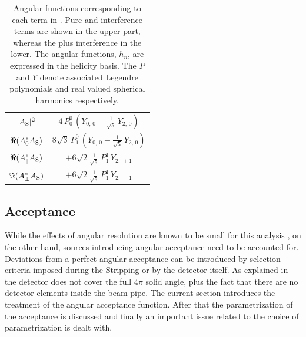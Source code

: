\begin{table}[t]
\begin{tabular}{cc}
    \hline
    $|{A}_{{\text{S}}}|^2$  &
      $4\, P_0^0\, (Y_{0,\,0} - \tfrac{1}{\sqrt{5}}\, Y_{2,\,0})$  \\ %

    $\Re({A}_{0}^* {A}_{{\text{S}}})$  &
      $8\sqrt{3}\, P_1^0\, (Y_{0,\,0} - \tfrac{1}{\sqrt{5}}\, Y_{2,\,0})$ \\ %

    $\Re({A}_{\parallel}^* {A}_{{\text{S}}})$  &
      $+6\sqrt{2}\tfrac{1}{\sqrt{5}}\, P_1^1\, Y_{2,\,+1}$  \\ %

    $\Im({A}_{\perp}^* {A}_{{\text{S}}})$  &
      $+6\sqrt{2}\tfrac{1}{\sqrt{5}}\, P_1^1\, Y_{2,\,-1}$  \\ %
    \hline
  \end{tabular}
  \caption{Angular functions corresponding to each term in . Pure and interference \pwave terms are shown in the upper part,
    whereas the \swave plus \spwave interference in the lower. The angular functions, $h_n$, are expressed in the helicity basis.
    The $P$ and $Y$ denote associated Legendre polynomials and real valued spherical harmonics respectively.}
  \label{ang_distr}
\end{table}

\subsection{Acceptance}
\label{Accceptance}
While the effects of angular resolution are known to be small for this analysis \cite{tristanThesis},
on the other hand, sources introducing angular acceptance need to be accounted for.
Deviations from a perfect angular acceptance can be introduced by selection criteria imposed during the Stripping or by the detector itself.
As explained in  the \lhcb detector does not cover the full $4\pi$ solid angle, plus the fact that
there are no detector elements inside the \lhc beam pipe. The current section introduces the treatment of
the angular acceptance function. After that the parametrization of the acceptance is discussed and finally an important
issue related to the choice of parametrization is dealt with.

